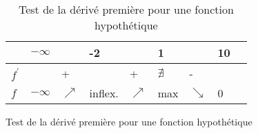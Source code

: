 \documentclass[2pt]{report}
\begin{document}
\begin{multicols*}{3}
    \begin{table}[H]
      \caption {Test de la dérivé première pour une fonction hypothétique}

      \begin{center}
        \renewcommand{\arraystretch}{1.5}
        \selectfont
        \tiny
        \begin{tabular}{|l|l|l|l|l|l|l|l|l}
        \arrayrulecolor{blue}\hline
        \rowcolor{lightBlue}
        \textcolor{myb}{} & \textcolor{myb}{ $-\infty$ } & & -2 & & 1 & & 10
        \\
        \hline
        \hline
        \arrayrulecolor{black} 
        $f^{\prime} $ &  & + &  & + & $\nexists$  & - & 
        \\ 
        \hline 
        $f$ & $-\infty$  & $\nearrow$ & inflex. & 
        $\nearrow$ & max & $\searrow$ & 0 
        \\ 
        \hline
      \end{tabular}
    \end{center}
    \end{table}

    

    \begin{table}[h]
      \caption {Test de la dérivé première pour une fonction hypothétique}


\end{table}
\end{multicols*}
\end{document}
